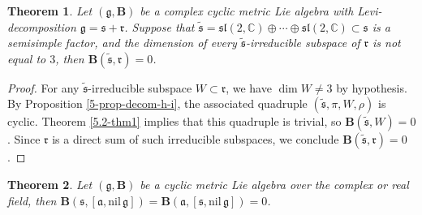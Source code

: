 \documentclass[reqno]{amsart}
\newtheorem{thm}{Theorem}[section]
\theoremstyle{definition}
\begin{document}
\begin{thm}\label{4-thm-b}
Let  $(\mathfrak{g},\mathbf{B})$ be a complex  cyclic metric Lie algebra with Levi-decomposition $\mathfrak{g}=\mathfrak{s}+\mathfrak{r}$. Suppose that $\tilde{\mathfrak{s}}=\mathfrak{sl}(2,\mathbb{C})\oplus\cdots\oplus\mathfrak{sl}(2,\mathbb{C})\subset \mathfrak{s}$ is a semisimple factor,
 and the dimension of every $\tilde{\mathfrak{s}}$-irreducible subspace of  $\mathfrak{r}$ is not equal to $3$,  then $\mathbf{B}(\tilde{\mathfrak{s}},\mathfrak{r})=0$.
\end{thm}
\begin{proof}
For any $\tilde{\mathfrak{s}}$-irreducible subspace $W\subset \mathfrak{r}$, we have $\dim W\neq 3$ by hypothesis. By Proposition \ref{5-prop-decom-h-i}, the associated quadruple $(\tilde{\mathfrak{s}},\pi,W,\rho)$
is cyclic.
Theorem \ref{5.2-thm1} implies that this quadruple is trivial, so $\mathbf{B}(\tilde{\mathfrak{s}},W)=0$.
Since $\mathfrak{r}$ is a direct sum of such irreducible subspaces, we conclude $\mathbf{B}(\tilde{\mathfrak{s}},\mathfrak{r})=0$.
\end{proof}
\begin{thm}\label{4-thm-c}
Let  $(\mathfrak{g},\mathbf{B})$ be a   cyclic metric Lie algebra over the complex or real field,
 then $\mathbf{B}(\mathfrak{s},[\mathfrak{a},\mathrm{nil}\,\mathfrak{g}])
=\mathbf{B}(\mathfrak{a},[\mathfrak{s},\mathrm{nil}\,\mathfrak{g}])=0$.
\end{thm}
\end{document}
